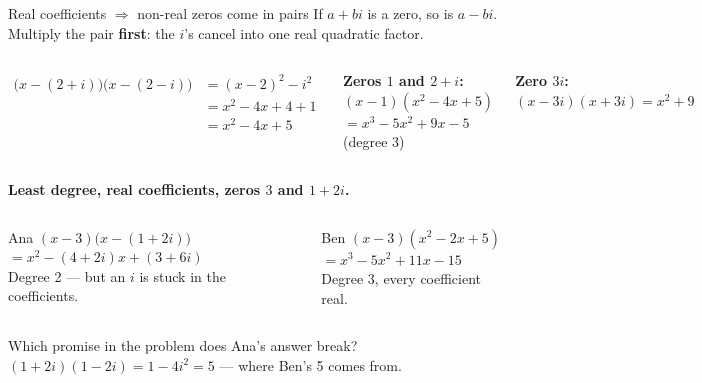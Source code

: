 \documentclass[aspectratio=169, 11pt]{beamer}
\begin{document}
\begin{frame}[t, plain]

  \begin{block}{Real coefficients \(\Rightarrow\) non-real zeros come in pairs}
    If \(a + bi\) is a zero, so is \(a - bi\). Multiply the pair \textbf{first}: the \(i\)'s
    cancel into one real quadratic factor.
  \end{block}

  \medskip
  \begin{columns}[T]
      \begin{align*}
        \bigl(x - (2 + i)\bigr)\bigl(x - (2 - i)\bigr) &= (x - 2)^2 - i^2 \\
          &= x^2 - 4x + 4 + 1 \\
          &= x^2 - 4x + 5
      \end{align*}

      \textbf{Zeros \(1\) and \(2 + i\):}\\[3pt]
      \((x - 1)(x^2 - 4x + 5)\)\\[3pt]
      \(= x^3 - 5x^2 + 9x - 5\) \quad (degree 3)

      \medskip
      \textbf{Zero \(3i\):} \((x - 3i)(x + 3i) = x^2 + 9\)
  \end{columns}
\end{frame}

\begin{frame}[t, plain]

  \textbf{Least degree, real coefficients, zeros \(3\) and \(1 + 2i\).}

  \medskip
  \begin{columns}[T]
      \begin{block}{Ana}
        \((x - 3)\bigl(x - (1 + 2i)\bigr)\)\\[3pt]
        \(= x^2 - (4 + 2i)x + (3 + 6i)\)\\[3pt]
        Degree 2 --- but an \(i\) is stuck in the coefficients.
      \end{block}

      \begin{block}{Ben}
        \((x - 3)(x^2 - 2x + 5)\)\\[3pt]
        \(= x^3 - 5x^2 + 11x - 15\)\\[3pt]
        Degree 3, every coefficient real.
      \end{block}
  \end{columns}

  \bigskip
  Which promise in the problem does Ana's answer break? \quad
  \((1 + 2i)(1 - 2i) = 1 - 4i^2 = 5\) --- where Ben's 5 comes from.
\end{frame}
\end{document}
